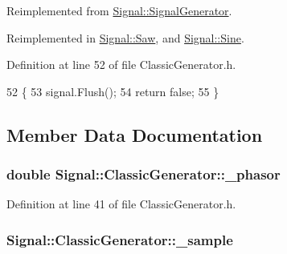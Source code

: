 Reimplemented from \hyperlink{class_signal_1_1_signal_generator_a126d52dd9b6b14d33efc624e2c89284e}{Signal\+::\+Signal\+Generator}.



Reimplemented in \hyperlink{class_signal_1_1_saw_a0d0d374c9b5a3f73f48e9fb1c444b0ca}{Signal\+::\+Saw}, and \hyperlink{class_signal_1_1_sine_ac0a6c6e24f830446ea75de3a392f7e06}{Signal\+::\+Sine}.



Definition at line 52 of file Classic\+Generator.\+h.


\begin{DoxyCode}
52                                                            \{
53         signal.Flush();
54         \textcolor{keywordflow}{return} \textcolor{keyword}{false};
55     \}
\end{DoxyCode}


\subsection{Member Data Documentation}
\hypertarget{class_signal_1_1_classic_generator_ade9b66bc49d2d2f40a1390fc6374b8b2}{
\subsubsection[{\+\_\+phasor}]{\setlength{\rightskip}{0pt plus 5cm}double Signal\+::\+Classic\+Generator\+::\+\_\+phasor\hspace{0.3cm}{\ttfamily [protected]}}}\label{class_signal_1_1_classic_generator_ade9b66bc49d2d2f40a1390fc6374b8b2}


Definition at line 41 of file Classic\+Generator.\+h.

\hypertarget{class_signal_1_1_classic_generator_a40313d0d806d6e44af7d41b3ef3a0822}{
\subsubsection[{\+\_\+sample}]{ Signal\+::\+Classic\+Generator\+::\+\_\+sample\hspace{0.3cm}{\ttfamily [protected]}}}\label{class_signal_1_1_classic_generator_a40313d0d806d6e44af7d41b3ef3a0822}


